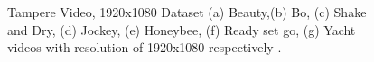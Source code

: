 \documentclass{book}
\begin{document}
\begin{figure}[bt!]
{		\label{fig:Class-T6}} 
	\caption{\label{fig:tampere_Video_Databases}
		Tampere Video, 1920x1080 Dataset  
		(a) Beauty,(b) Bo,
		(c) Shake and Dry, (d) Jockey, 
		(e) Honeybee, (f) Ready set go, (g) Yacht videos with resolution of 1920x1080 respectively \cite{UHDvideo}.}	
\end{figure}
\end{document}
